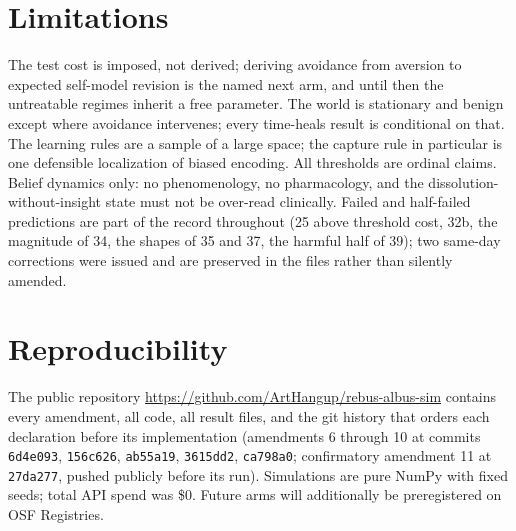 \documentclass[11pt]{article}
\begin{document}
\section{Limitations}
\label{sec:limitations}

The test cost is imposed, not derived; deriving avoidance from aversion to
expected self-model revision is the named next arm, and until then the
untreatable regimes inherit a free parameter. The world is stationary and benign
except where avoidance intervenes; every time-heals result is conditional on
that. The learning rules are a sample of a large space; the capture rule in
particular is one defensible localization of biased encoding. All thresholds are
ordinal claims. Belief dynamics only: no phenomenology, no pharmacology, and the
dissolution-without-insight state must not be over-read clinically. Failed and
half-failed predictions are part of the record throughout (25 above threshold
cost, 32b, the magnitude of 34, the shapes of 35 and 37, the harmful half of
39); two same-day corrections were issued and are preserved in the files rather
than silently amended.

\section{Reproducibility}
\label{sec:repro}

The public repository \url{https://github.com/ArtHangup/rebus-albus-sim}
contains every amendment, all code, all result files, and the git history that
orders each declaration before its implementation (amendments 6 through 10 at
commits \texttt{6d4e093}, \texttt{156c626}, \texttt{ab55a19}, \texttt{3615dd2},
\texttt{ca798a0}; confirmatory amendment 11 at \texttt{27da277}, pushed publicly
before its run). Simulations are pure NumPy with fixed seeds; total API spend
was \$0. Future arms will additionally be preregistered on OSF Registries.
\end{document}
